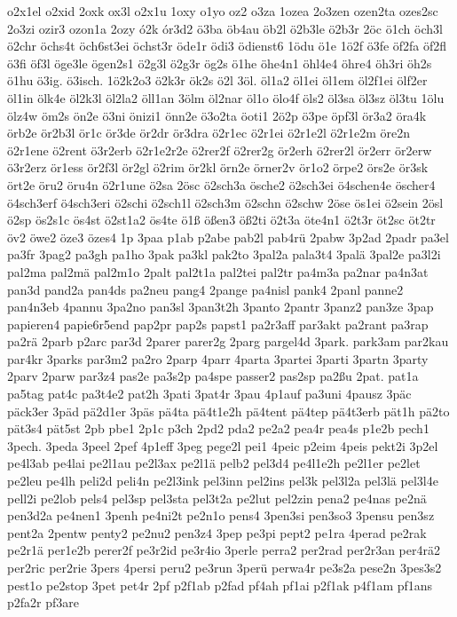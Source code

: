 {o2x1el
o2xid
2oxk
ox3l
o2x1u
1oxy
o1yo
oz2
o3za
1ozea
2o3zen
ozen2ta
ozes2sc
2o3zi
ozir3
ozon1a
2ozy
ó2k
ór3d2
ö3ba
öb4au
öb2l
ö2b3le
ö2b3r
2öc
ö1ch
öch3l
ö2chr
öchs4t
öch6st3ei
öchst3r
öde1r
ödi3
ödienst6
1ödu
ö1e
1ö2f
ö3fe
öf2fa
öf2fl
ö3fi
öf3l
öge3le
ögen2s1
ö2g3l
ö2g3r
ög2s
ö1he
öhe4n1
öhl4e4
öhre4
öh3ri
öh2s
ö1hu
ö3ig.
ö3isch.
1ö2k2o3
ö2k3r
ök2s
ö2l
3öl.
öl1a2
öl1ei
öl1em
öl2f1ei
ölf2er
öl1in
ölk4e
öl2k3l
öl2la2
öll1an
3ölm
öl2nar
öl1o
ölo4f
öls2
öl3sa
öl3sz
öl3tu
1ölu
ölz4w
öm2s
ön2e
ö3ni
önizi1
önn2e
ö3o2ta
öoti1
2ö2p
ö3pe
öpf3l
ör3a2
öra4k
örb2e
ör2b3l
ör1c
ör3de
ör2dr
ör3dra
ö2r1ec
ö2r1ei
ö2r1e2l
ö2r1e2m
öre2n
ö2r1ene
ö2rent
ö3r2erb
ö2r1e2r2e
ö2rer2f
ö2rer2g
ör2erh
ö2rer2l
ör2err
ör2erw
ö3r2erz
ör1ess
ör2f3l
ör2gl
ö2rim
ör2kl
örn2e
örner2v
ör1o2
örpe2
örs2e
ör3sk
ört2e
öru2
öru4n
ö2r1une
ö2sa
2ösc
ö2sch3a
ösche2
ö2sch3ei
ö4schen4e
öscher4
ö4sch3erf
ö4sch3eri
ö2schi
ö2sch1l
ö2sch3m
ö2schn
ö2schw
2öse
ös1ei
ö2sein
2ösl
ö2sp
ös2s1c
ös4st
ö2st1a2
ös4te
ö1ß
ößen3
öß2ti
ö2t3a
öte4n1
ö2t3r
öt2sc
öt2tr
öv2
öwe2
öze3
özes4
1p
3paa
p1ab
p2abe
pab2l
pab4rü
2pabw
3p2ad
2padr
pa3el
pa3fr
3pag2
pa3gh
pa1ho
3pak
pa3kl
pak2to
3pal2a
pala3t4
3palä
3pal2e
pa3l2i
pal2ma
pal2mä
pal2m1o
2palt
pal2t1a
pal2tei
pal2tr
pa4m3a
pa2nar
pa4n3at
pan3d
pand2a
pan4ds
pa2neu
pang4
2pange
pa4nisl
pank4
2panl
panne2
pan4n3eb
4pannu
3pa2no
pan3sl
3pan3t2h
3panto
2pantr
3panz2
pan3ze
3pap
papieren4
papie6r5end
pap2pr
pap2s
papst1
pa2r3aff
par3akt
pa2rant
pa3rap
pa2rä
2parb
p2arc
par3d
2parer
parer2g
2parg
pargel4d
3park.
park3am
par2kau
par4kr
3parks
par3m2
pa2ro
2parp
4parr
4parta
3partei
3parti
3partn
3party
2parv
2parw
par3z4
pas2e
pa3s2p
pa4spe
passer2
pas2sp
pa2ßu
2pat.
pat1a
pa5tag
pat4c
pa3t4e2
pat2h
3pati
3pat4r
3pau
4p1auf
pa3uni
4pausz
3päc
päck3er
3päd
pä2d1er
3päs
pä4ta
pä4t1e2h
pä4tent
pä4tep
pä4t3erb
pät1h
pä2to
pät3s4
pät5st
2pb
pbe1
2p1c
p3ch
2pd2
pda2
pe2a2
pea4r
pea4s
p1e2b
pech1
3pech.
3peda
3peel
2pef
4p1eff
3peg
pege2l
pei1
4peic
p2eim
4peis
pekt2i
3p2el
pe4l3ab
pe4lai
pe2l1au
pe2l3ax
pe2l1ä
pelb2
pel3d4
pe4l1e2h
pe2l1er
pe2let
pe2leu
pe4lh
peli2d
peli4n
pe2l3ink
pel3inn
pel2ins
pel3k
pel3l2a
pel3lä
pel3l4e
pell2i
pe2lob
pels4
pel3sp
pel3sta
pel3t2a
pe2lut
pel2zin
pena2
pe4nas
pe2nä
pen3d2a
pe4nen1
3penh
pe4ni2t
pe2n1o
pens4
3pen3si
pen3so3
3pensu
pen3sz
pent2a
2pentw
penty2
pe2nu2
pen3z4
3pep
pe3pi
pept2
pe1ra
4perad
pe2rak
pe2r1ä
per1e2b
perer2f
pe3r2id
pe3r4io
3perle
perra2
per2rad
per2r3an
per4rä2
per2ric
per2rie
3pers
4persi
peru2
pe3run
3perü
perwa4r
pe3s2a
pese2n
3pes3s2
pest1o
pe2stop
3pet
pet4r
2pf
p2f1ab
p2fad
pf4ah
pf1ai
p2f1ak
p4f1am
pf1ans
p2fa2r
pf3are
}
